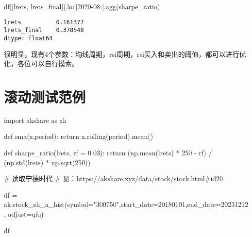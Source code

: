 \documentclass[
  letterpaper,
  DIV=11,
  numbers=noendperiod]{scrreprt}
\newenvironment{Shaded}{\begin{snugshade}}{\end{snugshade}}
\newcommand{\CommentTok}[1]{\textcolor[rgb]{0.37,0.37,0.37}{#1}}
\newcommand{\ControlFlowTok}[1]{\textcolor[rgb]{0.00,0.23,0.31}{#1}}
\newcommand{\DecValTok}[1]{\textcolor[rgb]{0.68,0.00,0.00}{#1}}
\newcommand{\FloatTok}[1]{\textcolor[rgb]{0.68,0.00,0.00}{#1}}
\newcommand{\ImportTok}[1]{\textcolor[rgb]{0.00,0.46,0.62}{#1}}
\newcommand{\KeywordTok}[1]{\textcolor[rgb]{0.00,0.23,0.31}{#1}}
\newcommand{\NormalTok}[1]{\textcolor[rgb]{0.00,0.23,0.31}{#1}}
\newcommand{\OperatorTok}[1]{\textcolor[rgb]{0.37,0.37,0.37}{#1}}
\newcommand{\StringTok}[1]{\textcolor[rgb]{0.13,0.47,0.30}{#1}}
\begin{document}
\begin{Shaded}
\begin{Highlighting}[]
\NormalTok{df[[}\StringTok{\textquotesingle{}lrets\textquotesingle{}}\NormalTok{, }\StringTok{\textquotesingle{}lrets\_final\textquotesingle{}}\NormalTok{]].loc[}\StringTok{\textquotesingle{}2020{-}08\textquotesingle{}}\NormalTok{:].agg(sharpe\_ratio)}
\end{Highlighting}
\end{Shaded}

\begin{verbatim}
lrets          0.161377
lrets_final    0.378548
dtype: float64
\end{verbatim}

很明显，现有4个参数：均线周期，rsi周期，rsi买入和卖出的阈值，都可以进行优化，各位可以自行摸索。

\hypertarget{ux6edaux52a8ux6d4bux8bd5ux8303ux4f8b}{%
\chapter{滚动测试范例}\label{ux6edaux52a8ux6d4bux8bd5ux8303ux4f8b}}

\begin{Shaded}
\begin{Highlighting}[]
\ImportTok{import}\NormalTok{ akshare }\ImportTok{as}\NormalTok{ ak}
\end{Highlighting}
\end{Shaded}

\begin{Shaded}
\begin{Highlighting}[]
\KeywordTok{def}\NormalTok{ sma(x,period):}
    \ControlFlowTok{return}\NormalTok{ x.rolling(period).mean()}

\KeywordTok{def}\NormalTok{ sharpe\_ratio(lrets, rf }\OperatorTok{=} \FloatTok{0.03}\NormalTok{):}
    \ControlFlowTok{return}\NormalTok{ (np.mean(lrets) }\OperatorTok{*} \DecValTok{250} \OperatorTok{{-}}\NormalTok{ rf) }\OperatorTok{/}\NormalTok{ (np.std(lrets) }\OperatorTok{*}\NormalTok{ np.sqrt(}\DecValTok{250}\NormalTok{))}
\end{Highlighting}
\end{Shaded}

\begin{Shaded}
\begin{Highlighting}[]
\CommentTok{\# 读取宁德时代}
\CommentTok{\# 见：https://akshare.xyz/data/stock/stock.html\#id20}

\NormalTok{df }\OperatorTok{=}\NormalTok{ ak.stock\_zh\_a\_hist(symbol}\OperatorTok{=}\StringTok{"300750"}\NormalTok{,start\_date}\OperatorTok{=}\StringTok{\textquotesingle{}20180101\textquotesingle{}}\NormalTok{,end\_date}\OperatorTok{=}\StringTok{\textquotesingle{}20231212\textquotesingle{}}\NormalTok{, adjust}\OperatorTok{=}\StringTok{\textquotesingle{}qfq\textquotesingle{}}\NormalTok{)}

\NormalTok{df}
\end{Highlighting}
\end{Shaded}
\end{document}
